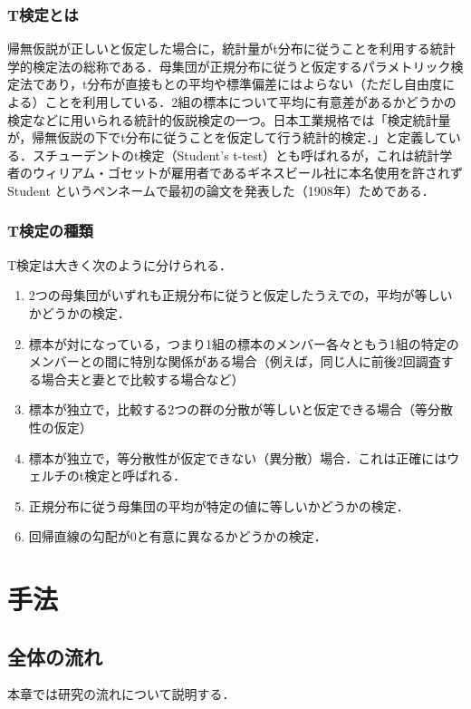 \subsection{T検定とは}
帰無仮説が正しいと仮定した場合に，統計量がt分布に従うことを利用する統計学的検定法の総称である．母集団が正規分布に従うと仮定するパラメトリック検定法であり，t分布が直接もとの平均や標準偏差にはよらない（ただし自由度による）ことを利用している．2組の標本について平均に有意差があるかどうかの検定などに用いられる統計的仮説検定の一つ。日本工業規格では「検定統計量が，帰無仮説の下でt分布に従うことを仮定して行う統計的検定．」と定義している．スチューデントのt検定（Student's t-test）とも呼ばれるが，これは統計学者のウィリアム・ゴセットが雇用者であるギネスビール社に本名使用を許されずStudent というペンネームで最初の論文を発表した（1908年）ためである．


\subsection{T検定の種類}
T検定は大きく次のように分けられる．

\begin{enumerate}
\item 2つの母集団がいずれも正規分布に従うと仮定したうえでの，平均が等しいかどうかの検定．
\item 標本が対になっている，つまり1組の標本のメンバー各々ともう1組の特定のメンバーとの間に特別な関係がある場合（例えば，同じ人に前後2回調査する場合夫と妻とで比較する場合など）
\item 標本が独立で，比較する2つの群の分散が等しいと仮定できる場合（等分散性の仮定）
\item 標本が独立で，等分散性が仮定できない（異分散）場合．これは正確にはウェルチのt検定と呼ばれる．
\item 正規分布に従う母集団の平均が特定の値に等しいかどうかの検定．
\item 回帰直線の勾配が0と有意に異なるかどうかの検定．
\end{enumerate}
\newpage

\chapter{手法}

\section{全体の流れ}

本章では研究の流れについて説明する．

